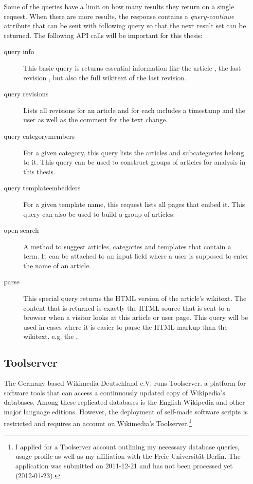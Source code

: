 Some of the queries have a limit on how many results they return on a single request.
When there are more results, the response contains a \emph{query-continue} attribute that can be sent with following query so that the next result set can be returned.
The following \ac{API} calls will be important for this thesis:

\begin{description}
    \item[query info] This basic query is returns essential information like the article , the last revision , but also the full wikitext of the last revision.
    \item[query revisions] Lists all revisions for an article and for each includes a timestamp and the user as well as the comment for the text change.
    \item[query categorymembers] For a given category, this query lists the articles and subcategories belong to it.
    This query can be used to construct groups of articles for analysis in this thesis.
    \item[query templateembedders] For a given template name, this request lists all pages that embed it.
    This query can also be used to build a group of articles. 
    \item[open search] A method to suggest articles, categories and templates that contain a term. 
    It can be attached to an input field where a user is supposed to enter the name of an article.
    \item[parse] This special query returns the \ac{HTML} version of the article's wikitext.
    The content that is returned is exactly the \ac{HTML} source that is sent to a browser when a visitor looks at this article or user page.
    This query will be used in cases where it is easier to parse the \ac{HTML} markup than the wikitext, e.g. the .
\end{description}

\subsection{Toolserver}\label{sub:toolserver}

The Germany based Wikimedia Deutschland e.V. runs Toolserver, a platform for software tools that can access a continuously updated copy of Wikipedia's databases. 
Among these replicated databases is the English Wikipedia and other major language editions.
However, the deployment of self-made software scripts is restricted and requires an account on Wikimedia's Toolserver.\footnote{I applied for a Toolserver account outlining my necessary database queries, usage profile as well as my affiliation with the Freie Universit\"at Berlin. The application was submitted on 2011-12-21 and has not been processed yet (2012-01-23).}


